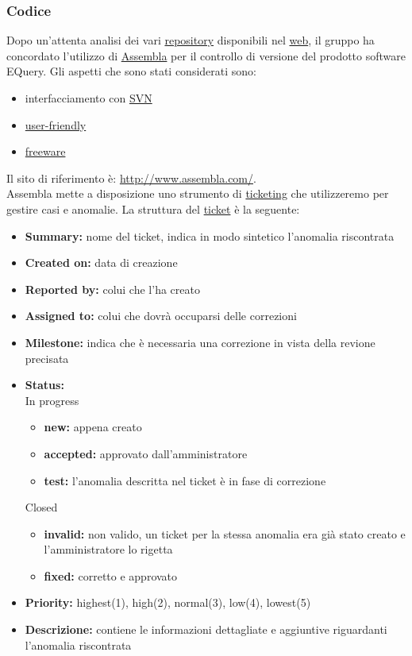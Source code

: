 \documentclass[a4paper,11pt]{article}
\begin{document}
\subsubsection{Codice}
Dopo un'attenta analisi dei vari \underline{repository} disponibili nel \underline{web}, il gruppo ha concordato l'utilizzo di \underline{Assembla} per il controllo di versione del prodotto software EQuery.
Gli aspetti che sono stati considerati sono:
\begin{itemize}
\item interfacciamento con \underline{SVN}
\item \underline{user-friendly}
\item \underline{freeware}
\end{itemize}
Il sito di riferimento \`e: \url{http://www.assembla.com/}.\\
Assembla mette a disposizione uno strumento di \underline{ticketing} che utilizzeremo per gestire casi e anomalie.
La struttura del \underline{ticket} \`e la seguente:
\begin{itemize}
\item \textbf{Summary:} nome del ticket, indica in modo sintetico l'anomalia riscontrata
\item \textbf{Created on:} data di creazione
\item \textbf{Reported by:} colui che l'ha creato
\item \textbf{Assigned to:} colui che dovr\`a occuparsi delle correzioni
\item \textbf{Milestone:} indica che \`e necessaria una correzione in vista della revione precisata
\item \textbf{Status:}\\
In progress
\begin{itemize}
\item \textbf{new:} appena creato
\item \textbf{accepted:} approvato dall'amministratore
\item \textbf{test:} l'anomalia descritta nel ticket \`e in fase di correzione
\end{itemize}
Closed
\begin{itemize}
\item \textbf{invalid:} non valido, un ticket per la stessa anomalia era gi\`a stato creato e l'amministratore lo rigetta
\item \textbf{fixed:} corretto e approvato
\end{itemize}
\item \textbf{Priority:} highest(1), high(2), normal(3), low(4), lowest(5)
\item \textbf{Descrizione:} contiene le informazioni dettagliate e aggiuntive riguardanti l'anomalia riscontrata
\end{itemize}
\end{document}
